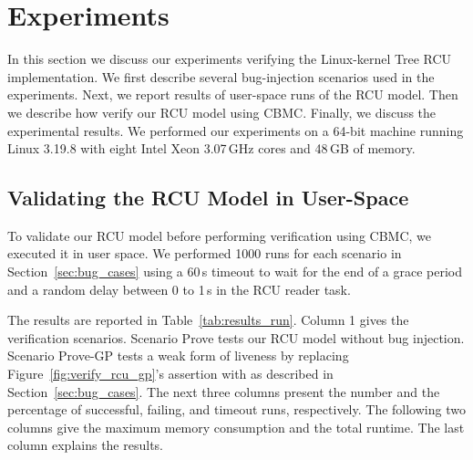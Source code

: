\section{Experiments}

In this section we discuss our experiments verifying the Linux-kernel 
Tree RCU implementation. We first describe several bug-injection
scenarios used in the experiments. Next, we report results of user-space runs
of the RCU model. Then we describe how verify our RCU model using CBMC. 
Finally, we discuss the experimental results.
We performed our experiments on a 64-bit machine running Linux 3.19.8
with eight Intel Xeon 3.07\,GHz cores and 48\,GB of memory.



\subsection{Validating the RCU Model in User-Space}\label{sec:test_model}



To validate our RCU model before performing verification using CBMC, 
we executed it in user space. We performed 1000 runs for each scenario 
in Section~\ref{sec:bug_cases} using a 60\,s timeout to wait for the end of a 
grace period and a random delay between 0 to 1\,s in the RCU reader task.

The results are reported in Table~\ref{tab:results_run}.  Column 1 %
gives the verification scenarios. %
Scenario Prove tests our RCU model without bug injection. Scenario Prove-GP 
tests a weak form of liveness by replacing Figure~\ref{fig:verify_rcu_gp}'s 
assertion with  as described in Section~\ref{sec:bug_cases}.
The next three columns present the number and the percentage of successful, 
failing, and timeout runs, respectively. The following two columns give the 
maximum memory consumption and the total runtime. The last column explains 
the results. 

